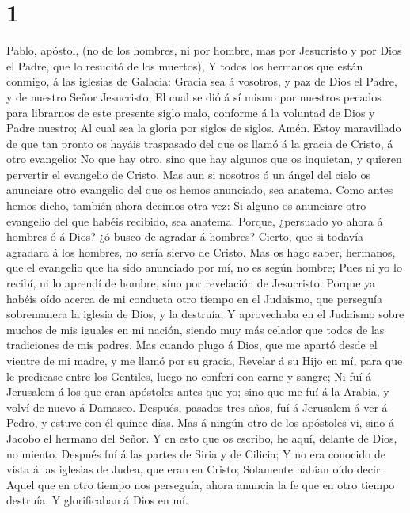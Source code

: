 \hypertarget{section}{%
\section{1}\label{section}}

 Pablo, apóstol, (no de los hombres, ni por hombre, mas por
Jesucristo y por Dios el Padre, que lo resucitó de los muertos),
 Y todos los hermanos que están conmigo, á las iglesias de
Galacia:  Gracia sea á vosotros, y paz de Dios el Padre, y
de nuestro Señor Jesucristo,  El cual se dió á sí mismo por
nuestros pecados para librarnos de este presente siglo malo, conforme á
la voluntad de Dios y Padre nuestro;  Al cual sea la gloria
por siglos de siglos. Amén.  Estoy maravillado de que tan
pronto os hayáis traspasado del que os llamó á la gracia de Cristo, á
otro evangelio:  No que hay otro, sino que hay algunos que
os inquietan, y quieren pervertir el evangelio de Cristo. 
Mas aun si nosotros ó un ángel del cielo os anunciare otro evangelio del
que os hemos anunciado, sea anatema.  Como antes hemos
dicho, también ahora decimos otra vez: Si alguno os anunciare otro
evangelio del que habéis recibido, sea anatema.  Porque,
¿persuado yo ahora á hombres ó á Dios? ¿ó busco de agradar á hombres?
Cierto, que si todavía agradara á los hombres, no sería siervo de
Cristo.  Mas os hago saber, hermanos, que el evangelio que
ha sido anunciado por mí, no es según hombre;  Pues ni yo
lo recibí, ni lo aprendí de hombre, sino por revelación de Jesucristo.
 Porque ya habéis oído acerca de mi conducta otro tiempo en
el Judaismo, que perseguía sobremanera la iglesia de Dios, y la
destruía;  Y aprovechaba en el Judaismo sobre muchos de mis
iguales en mi nación, siendo muy más celador que todos de las
tradiciones de mis padres.  Mas cuando plugo á Dios, que me
apartó desde el vientre de mi madre, y me llamó por su gracia,
 Revelar á su Hijo en mí, para que le predicase entre los
Gentiles, luego no conferí con carne y sangre;  Ni fuí á
Jerusalem á los que eran apóstoles antes que yo; sino que me fuí á la
Arabia, y volví de nuevo á Damasco.  Después, pasados tres
años, fuí á Jerusalem á ver á Pedro, y estuve con él quince días.
 Mas á ningún otro de los apóstoles vi, sino á Jacobo el
hermano del Señor.  Y en esto que os escribo, he aquí,
delante de Dios, no miento.  Después fuí á las partes de
Siria y de Cilicia;  Y no era conocido de vista á las
iglesias de Judea, que eran en Cristo;  Solamente habían
oído decir: Aquel que en otro tiempo nos perseguía, ahora anuncia la fe
que en otro tiempo destruía.  Y glorificaban á Dios en mí.

